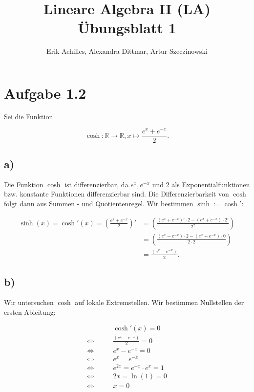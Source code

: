 \documentclass{article}
\title{Lineare Algebra II (LA) Übungsblatt 1}
\author{Erik Achilles, Alexandra Dittmar, Artur Szeczinowski}
\newcommand{\RR}{\mathbb{R}}
\begin{document}
\maketitle
\vfill

\section*{Aufgabe 1.2}

Sei die Funktion

\[
\cosh : \RR \to \RR ,
x \mapsto \frac{e^x + e^{ - x}}{2}.
\]

\subsection*{a)}

Die Funktion 
$ \cosh $
ist differenzierbar, da
$ e^x, e^{ - x} $
und
$ 2 $
als Exponentialfunktionen bzw. konstante Funktionen differenzierbar sind. Die Differenzierbarkeit von 
$ \cosh $
folgt dann aus Summen - und Quotientenregel.
Wir bestimmen 
$ \sinh := \cosh' $:

\[
\begin{aligned}
    \sinh(x) = \cosh'(x)
    =
    \left(\frac{e^x + e^{ - x}}{2}\right)'
    & =
    \left( \frac{(e^x + e^{- x})' \cdot 2 -
    (e^x + e^{ - x}) \cdot 2'}{2^2} \right)
    \\ &=
    \left( \frac{(e^x - e^{- x}) \cdot 2 -
    (e^x + e^{ - x}) \cdot 0}{2 \cdot 2} \right)
    \\ &=
    \frac{(e^x - e^{ - x})}{2}.
\end{aligned}
\]

\newpage

\subsection*{b)}

Wir untersuchen 
$ \cosh $
auf lokale Extremstellen.
Wir bestimmen Nullstellen der ersten Ableitung:

\[
\begin{aligned}
    &\cosh'(x) = 0
    \\ \Leftrightarrow \qquad &
    \frac{(e^x - e^{ - x})}{2} = 0
    \\ \Leftrightarrow \qquad &
    e^x - e^{ - x} = 0
    \\ \Leftrightarrow \qquad &
    e^x = e^{ - x}
    \\ \Leftrightarrow \qquad &
    e^{2x} = e^{ - x} \cdot e^x = 1
    \\ \Leftrightarrow \qquad &
    2x = \ln(1) = 0
    \\ \Leftrightarrow \qquad &
    x = 0
\end{aligned}
\]
\end{document}
